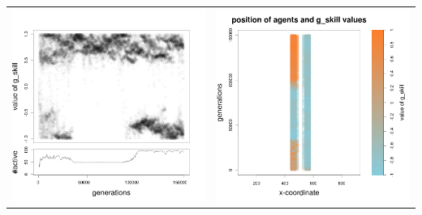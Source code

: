 \documentclass[a4paper,10pt]{article}
\begin{document}
\begin{table}[H]
\begin{tabular}{cc}
 \newline
 \includegraphics[width=\imgSize]{../images/5StaticEnv/Gplot99_staticEnv3}&\includegraphics[width=\imgSize]{../images/5StaticEnv/Gplot99Static_staticEnv3}\\
\end{tabular}

\end{table}
\end{document}
